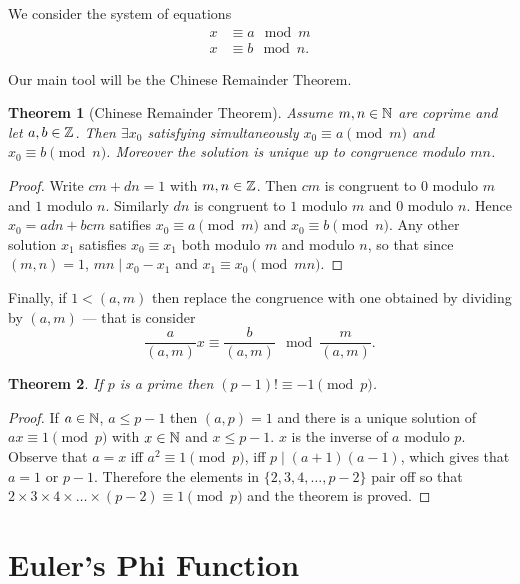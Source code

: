 \documentclass{notes}
\theoremstyle{plain}
\newtheorem{theorem}{Theorem}[chapter]
\begin{document}
We consider the system of equations
\begin{align*}
x &\equiv a \mod{m} \\
x &\equiv b \mod{n}.
\end{align*}

Our main tool will be the Chinese Remainder Theorem.

\begin{theorem}[Chinese Remainder Theorem]\label{T:CRT}
Assume $m,n \in \mathbb{N}$ are coprime and let $a, b \in \mathbb{Z}$.  Then
$\exists x_0$ satisfying simultaneously $x_0 \equiv a \pmod{m}$ and
$x_0 \equiv b \pmod{n}$.  Moreover the solution is unique up to congruence
modulo $mn$.
\end{theorem}

\begin{proof}
Write $c m + d n = 1$ with $m,n \in \mathbb{Z}$.  Then $cm$ is congruent to $0$
modulo $m$ and $1$ modulo $n$.  Similarly $dn$ is congruent to $1$
modulo $m$ and $0$ modulo $n$.  Hence $x_0 = a d n + b c m$ satifies
$x_0 \equiv a \pmod{m}$ and $x_0 \equiv b \pmod{n}$.  Any other solution
$x_1$ satisfies $x_0 \equiv x_1$ both modulo $m$ and modulo $n$, so that
since $(m,n) = 1$, $m n \mid x_0 - x_1$ and $x_1 \equiv x_0 \pmod{mn}$.
\end{proof}

Finally, if $1 < (a,m)$ then replace the congruence with one
obtained by dividing by $(a,m)$ --- that is consider
\[
\frac{a}{(a,m)} x \equiv \frac{b}{(a,m)} \mod{\frac{m}{(a,m)}}.
\]

\begin{theorem}\label{T:Wilsons}
If $p$ is a prime then $(p-1)! \equiv -1 \pmod{p}$.
\end{theorem}

\begin{proof}
If $a \in \mathbb{N}$, $a \le p-1$ then $(a,p) = 1$ and there is a unique solution of
$a x \equiv 1 \pmod{p}$ with $x \in \mathbb{N}$ and $x \le p-1$.  $x$ is the inverse
of $a$ modulo $p$.  Observe that $a = x$ iff $a^2 \equiv 1 \pmod{p}$, iff
$p \mid (a+1)(a-1)$, which gives that $a = 1$ or $p - 1$.  Therefore the
elements in $\{2, 3, 4, \dots, p-2 \}$ pair off so that
$2 \times 3 \times 4 \times \dots \times (p-2) \equiv 1 \pmod{p}$ and
the theorem is proved.
\end{proof}

\section{Euler's Phi Function}
\end{document}
